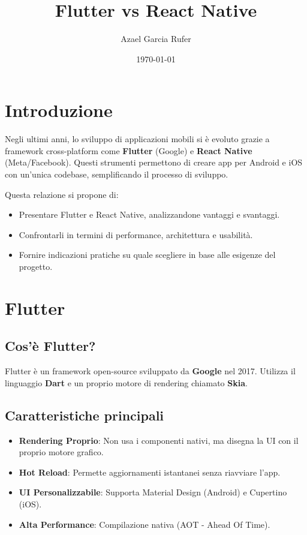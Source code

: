 \documentclass[a4paper,10pt]{article}
\title{\textbf{Flutter vs React Native}}
\author{Azael Garcia Rufer}
\date{\today}
\begin{document}
\maketitle

\tableofcontents
\newpage

\section{Introduzione}
Negli ultimi anni, lo sviluppo di applicazioni mobili si è evoluto grazie a framework cross-platform come \textbf{Flutter} (Google) e \textbf{React Native} (Meta/Facebook). Questi strumenti permettono di creare app per Android e iOS con un’unica codebase, semplificando il processo di sviluppo.

Questa relazione si propone di:
\begin{itemize}
    \item Presentare Flutter e React Native, analizzandone vantaggi e svantaggi.
    \item Confrontarli in termini di performance, architettura e usabilità.
    \item Fornire indicazioni pratiche su quale scegliere in base alle esigenze del progetto.
\end{itemize}

\section{Flutter}
\subsection{Cos’è Flutter?}
Flutter è un framework open-source sviluppato da \textbf{Google} nel 2017. Utilizza il linguaggio \textbf{Dart} e un proprio motore di rendering chiamato \textbf{Skia}.

\subsection{Caratteristiche principali}
\begin{itemize}
    \item \textbf{Rendering Proprio}: Non usa i componenti nativi, ma disegna la UI con il proprio motore grafico.
    \item \textbf{Hot Reload}: Permette aggiornamenti istantanei senza riavviare l’app.
    \item \textbf{UI Personalizzabile}: Supporta Material Design (Android) e Cupertino (iOS).
    \item \textbf{Alta Performance}: Compilazione nativa (AOT - Ahead Of Time).
\end{itemize}
\end{document}
